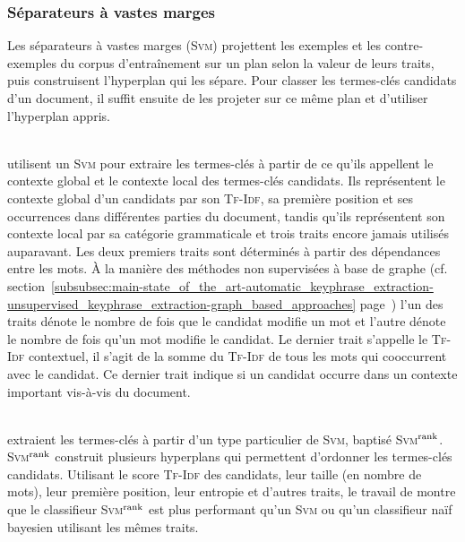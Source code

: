       \subsubsection{Séparateurs à vastes marges}
      \label{subsubsec:main-state_of_the_art-automatic_keyphrase_extraction-supervised_keyphrase_extraction-svms}
        Les séparateurs à vastes marges (\textsc{Svm}) projettent les exemples
        et les contre-exemples du corpus d'entraînement sur un plan selon la
        valeur de leurs traits, puis construisent l'hyperplan qui les sépare.
        Pour classer les termes-clés candidats d'un document, il suffit ensuite
        de les projeter sur ce même plan et d'utiliser l'hyperplan appris.

        ~\\ utilisent un \textsc{Svm} pour extraire les
        termes-clés à partir de ce qu'ils appellent le contexte global et le
        contexte local des termes-clés candidats. Ils représentent le contexte
        global d'un candidats par son \textsc{Tf-Idf}, sa première position et
        ses occurrences dans différentes parties du document, tandis qu'ils
        représentent son contexte local par sa catégorie grammaticale et trois
        traits encore jamais utilisés auparavant. Les deux premiers traits sont
        déterminés à partir des dépendances entre les mots. À la manière des
        méthodes non supervisées à base de graphe (cf.
        section~\ref{subsubsec:main-state_of_the_art-automatic_keyphrase_extraction-unsupervised_keyphrase_extraction-graph_based_approaches}
        page~\pageref{subsubsec:main-state_of_the_art-automatic_keyphrase_extraction-unsupervised_keyphrase_extraction-graph_based_approaches})
        l'un des traits dénote le nombre de fois que le candidat modifie un mot
        et l'autre dénote le nombre de fois qu'un mot modifie le candidat. Le
        dernier trait s'appelle le \textsc{Tf-Idf} contextuel, il s'agit de la
        somme du \textsc{Tf-Idf} de tous les mots qui cooccurrent avec le
        candidat. Ce dernier trait indique si un candidat occurre dans un
        contexte important vis-à-vis du document.

        ~\\ extraient les termes-clés à partir d'un
        type particulier de \textsc{Svm}, baptisé
        \textsc{Svm}$^\textnormal{rank}$. \textsc{Svm}$^\textnormal{rank}$
        construit plusieurs hyperplans qui permettent d'ordonner les termes-clés
        candidats. Utilisant le score \textsc{Tf-Idf} des candidats, leur taille
        (en nombre de mots), leur première position, leur entropie et d'autres
        traits, le travail de  montre que le
        classifieur \textsc{Svm}$^\textnormal{rank}$ est plus performant qu'un
        \textsc{Svm} ou qu'un classifieur naïf bayesien utilisant les mêmes
        traits.


